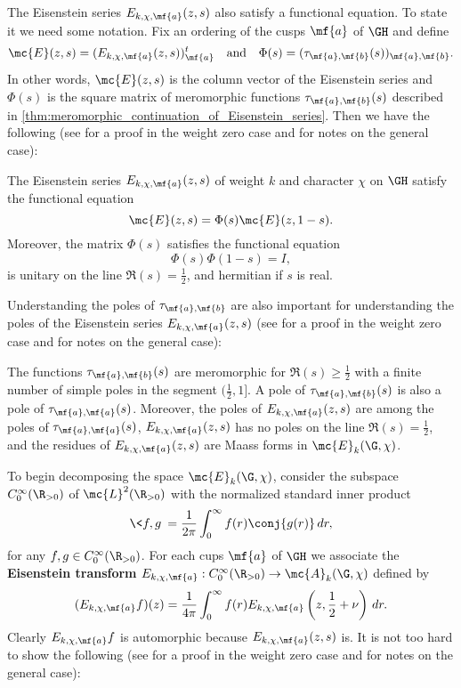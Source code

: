     The Eisenstein series $E_{k,\chi,\mf{a}}(z,s)$ also satisfy a functional equation. To state it we need some notation. Fix an ordering of the cusps $\mf{a}$ of $\GH$ and define
    \[
      \mc{E}(z,s) = (E_{k,\chi,\mf{a}}(z,s))_{\mf{a}}^{t} \quad \text{and} \quad \Phi(s) = (\tau_{\mf{a},\mf{b}}(s))_{\mf{a},\mf{b}}.
    \]
    In other words, $\mc{E}(z,s)$ is the column vector of the Eisenstein series and $\Phi(s)$ is the square matrix of meromorphic functions $\tau_{\mf{a},\mf{b}}(s)$ described in \cref{thm:meromorphic_continuation_of_Eisenstein_series}. Then we have the following (see \cite{iwaniec2002spectral} for a proof in the weight zero case and \cite{cohenmodular2017} for notes on the general case): 

    \begin{theorem}\label{thm:functional_equation_of_Eisenstein_series}
      The Eisenstein series $E_{k,\chi,\mf{a}}(z,s)$ of weight $k$ and character $\chi$ on $\GH$ satisfy the functional equation 
      \[
        \mc{E}(z,s) = \Phi(s)\mc{E}(z,1-s).
      \]
      Moreover, the matrix $\Phi(s)$ satisfies the functional equation
      \[
        \Phi(s)\Phi(1-s) = I,
      \]
      is unitary on the line $\Re(s) = \frac{1}{2}$, and hermitian if $s$ is real.
    \end{theorem}

    Understanding the poles of $\tau_{\mf{a},\mf{b}}$ are also important for understanding the poles of the Eisenstein series $E_{k,\chi,\mf{a}}(z,s)$ (see \cite{iwaniec2002spectral} for a proof in the weight zero case and \cite{cohenmodular2017} for notes on the general case):

    \begin{theorem}\label{thm:residues_of_Eisenstein_series}
      The functions $\tau_{\mf{a},\mf{b}}(s)$ are meromorphic for $\Re(s) \ge \frac{1}{2}$ with a finite number of simple poles in the segment $(\frac{1}{2},1]$. A pole of $\tau_{\mf{a},\mf{b}}(s)$ is also a pole of $\tau_{\mf{a},\mf{a}}(s)$. Moreover, the poles of $E_{k,\chi,\mf{a}}(z,s)$ are among the poles of $\tau_{\mf{a},\mf{a}}(s)$, $E_{k,\chi,\mf{a}}(z,s)$ has no poles on the line $\Re(s) = \frac{1}{2}$, and the residues of $E_{k,\chi,\mf{a}}(z,s)$ are Maass forms in $\mc{E}_{k}(\G,\chi)$.
    \end{theorem}

    To begin decomposing the space $\mc{E}_{k}(\G,\chi)$, consider the subspace $C_{0}^{\infty}(\R_{> 0})$ of $\mc{L}^{2}(\R_{> 0})$ with the normalized standard inner product
    \[
      \<f,g\> = \frac{1}{2\pi}\int_{0}^{\infty}f(r)\conj{g(r)}\,dr,
    \]
    for any $f,g \in C_{0}^{\infty}(\R_{> 0})$. For each cups $\mf{a}$ of $\GH$ we associate the \textbf{Eisenstein transform} $E_{k,\chi,\mf{a}}:C_{0}^{\infty}(\R_{> 0}) \to \mc{A}_{k}(\G,\chi)$ defined by
    \[
      (E_{k,\chi,\mf{a}}f)(z) = \frac{1}{4\pi}\int_{0}^{\infty}f(r)E_{k,\chi,\mf{a}}\left(z,\frac{1}{2}+\nu\right)\,dr.
    \]
    Clearly $E_{k,\chi,\mf{a}}f$ is automorphic because $E_{k,\chi,\mf{a}}(z,s)$ is. It is not too hard to show the following (see \cite{iwaniec2002spectral} for a proof in the weight zero case and \cite{cohenmodular2017} for notes on the general case):

